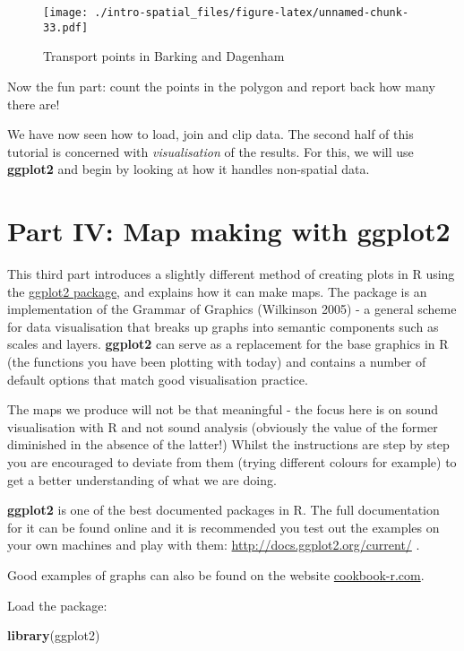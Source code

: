 \documentclass[]{article}
\newenvironment{Shaded}{}{}
\newcommand{\KeywordTok}[1]{\textcolor[rgb]{0.00,0.44,0.13}{\textbf{{#1}}}}
\newcommand{\NormalTok}[1]{{#1}}
\begin{document}
\begin{figure}[htbp]
\centering
\texttt{[image: ./intro-spatial\_files/figure-latex/unnamed-chunk-33.pdf]}
\caption{Transport points in Barking and Dagenham}
\end{figure}

Now the fun part: count the points in the polygon and report back how
many there are!

We have now seen how to load, join and clip data. The second half of
this tutorial is concerned with \emph{visualisation} of the results. For
this, we will use \textbf{ggplot2} and begin by looking at how it
handles non-spatial data.

\section{Part IV: Map making with
ggplot2}\label{part-iv-map-making-with-ggplot2}

This third part introduces a slightly different method of creating plots
in R using the \href{http://ggplot2.org/}{ggplot2 package}, and explains
how it can make maps. The package is an implementation of the Grammar of
Graphics (Wilkinson 2005) - a general scheme for data visualisation that
breaks up graphs into semantic components such as scales and layers.
\textbf{ggplot2} can serve as a replacement for the base graphics in R
(the functions you have been plotting with today) and contains a number
of default options that match good visualisation practice.

The maps we produce will not be that meaningful - the focus here is on
sound visualisation with R and not sound analysis (obviously the value
of the former diminished in the absence of the latter!) Whilst the
instructions are step by step you are encouraged to deviate from them
(trying different colours for example) to get a better understanding of
what we are doing.

\textbf{ggplot2} is one of the best documented packages in R. The full
documentation for it can be found online and it is recommended you test
out the examples on your own machines and play with them:
\url{http://docs.ggplot2.org/current/} .

Good examples of graphs can also be found on the website
\href{http://www.cookbook-r.com/Graphs/}{cookbook-r.com}.

Load the package:

\begin{Shaded}
\begin{Highlighting}[]
\KeywordTok{library}\NormalTok{(ggplot2)}
\end{Highlighting}
\end{Shaded}
\end{document}
